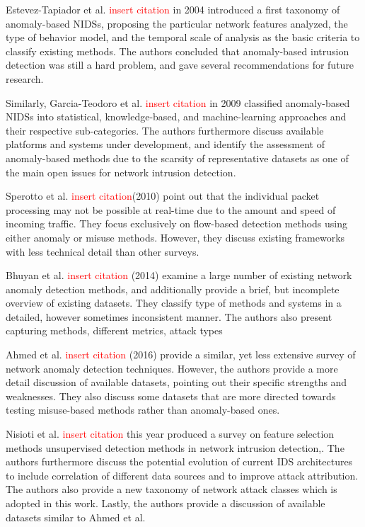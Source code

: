 \documentclass[a4paper,12pt,twoside]{report}
\begin{document}
Estevez-Tapiador et al. \textcolor{red}{insert citation} in 2004 introduced a first taxonomy of anomaly-based NIDSs, proposing the particular network features analyzed, the type of behavior model, and the temporal scale of analysis as the basic criteria to classify existing methods. The authors concluded that anomaly-based intrusion detection was still a hard problem, and gave several recommendations for future research. 

Similarly, Garcia-Teodoro et al. \textcolor{red}{insert citation} in 2009 classified anomaly-based NIDSs into statistical, knowledge-based, and machine-learning approaches and their respective sub-categories. The authors furthermore discuss available platforms and systems under development, and identify the assessment of anomaly-based methods due to the scarsity of representative datasets as one of the main open issues for network intrusion detection.

Sperotto et al. \textcolor{red}{insert citation}(2010) point out that the individual packet processing may not be possible at real-time due to the amount and speed of incoming traffic. They focus exclusively on flow-based detection methods using either anomaly or misuse methods. However, they discuss existing frameworks with less technical detail than other surveys. 

Bhuyan et al. \textcolor{red}{insert citation} (2014) examine a large number of existing network anomaly detection methods, and additionally provide a brief, but incomplete overview of existing datasets. They classify type of methods and systems in a detailed, however sometimes inconsistent manner. The authors also present capturing methods,  different 
metrics, attack types

Ahmed et al. \textcolor{red}{insert citation} (2016) provide a similar, yet less extensive survey of network anomaly detection techniques. However, the authors provide a more detail discussion of available datasets, pointing out their specific strengths and weaknesses. They also discuss some datasets that are more directed towards testing misuse-based methods rather than anomaly-based ones. 

Nisioti et al. \textcolor{red}{insert citation} this year produced a survey on feature selection methods unsupervised detection methods in network intrusion detection,. The authors furthermore discuss the potential evolution of current IDS architectures to include correlation of different data sources and to improve attack attribution. The authors also provide a new taxonomy of network attack classes which is adopted in this work. Lastly, the authors provide a discussion of available datasets similar to Ahmed et al.
\end{document}
